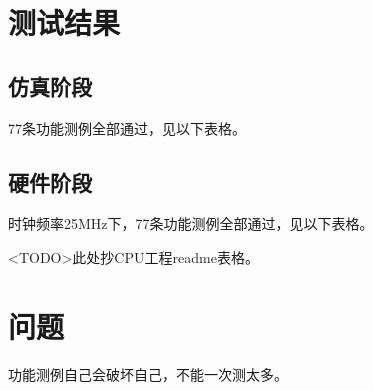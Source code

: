 \section{测试结果}

\subsection{仿真阶段}

77条功能测例全部通过，见以下表格。

\subsection{硬件阶段}

时钟频率25MHz下，77条功能测例全部通过，见以下表格。

<TODO>此处抄CPU工程readme表格。

\section{问题}

功能测例自己会破坏自己，不能一次测太多。